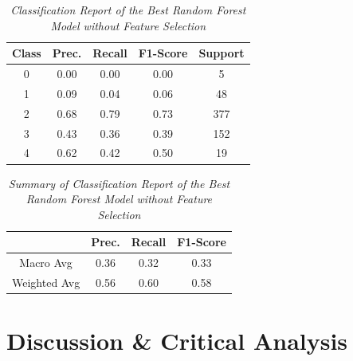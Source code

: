 \documentclass[11pt]{article}
\begin{document}
\begin{table}[!ht]
    \begin{center}
        \begin{tabular}{c|c|c|c|c}			
            \hline
            Class & Prec. & Recall & F1-Score & Support \\
            \hline\hline
            0 & 0.00 & 0.00 & 0.00 & 5 \\
            1 & 0.09 & 0.04 & 0.06 & 48 \\
            2 & 0.68 & 0.79 & 0.73 & 377 \\
            3 & 0.43 & 0.36 & 0.39 & 152 \\
            4 & 0.62 & 0.42 & 0.50 & 19\\
                \hline
        \end{tabular}

    \caption{\textit{Classification Report of the Best Random Forest Model without Feature Selection}}
        \label{rf-ft-report}

    \end{center}
\end{table}
\begin{table}[!ht]
    \begin{center}
        \begin{tabular}{c||c|c|c}			
            \hline
             & Prec. & Recall & F1-Score \\
            \hline\hline
            Macro Avg & 0.36 & 0.32 & 0.33 \\
            Weighted Avg & 0.56 & 0.60 & 0.58 \\
                \hline
        \end{tabular}

        \caption{\textit{Summary of Classification Report of the Best Random Forest Model without Feature Selection}}
        \label{rf-ft-report-sum}

    \end{center}
\end{table}

\section{Discussion \& Critical Analysis}
\end{document}

